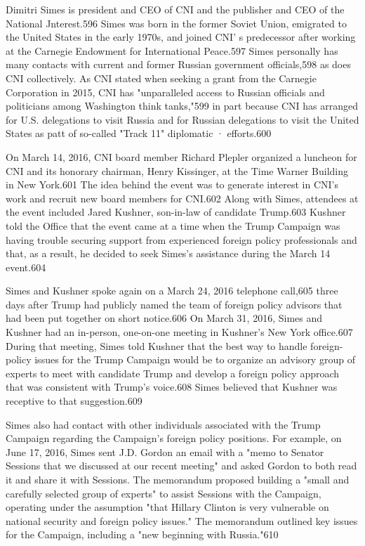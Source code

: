 Dimitri Simes is president and CEO of CNI and the publisher and CEO of the National Jnterest.596 Simes was born in the former Soviet Union, emigrated to the United States in the early 1970s, and joined CNI' s predecessor after working at the Carnegie Endowment for International Peace.597 Simes personally has many contacts with current and former Russian government officials,598 as does CNI collectively. As CNI stated when seeking a  grant from the Carnegie Corporation in 2015,  CNI has "unparalleled access to Russian officials and politicians among Washington think tanks,"599 in part because CNI has arranged for U.S. delegations to visit Russia and for Russian delegations to visit the United States as patt of so-called "Track 11" diplomatic · efforts.600

On March 14, 2016, CNI board member Richard Plepler organized a luncheon for CNI and its honorary chairman, Henry Kissinger, at the Time Warner Building in New York.601 The idea behind the event was to generate interest in CNI's work and recruit new board members for CNI.602 Along with Simes, attendees at the event included Jared Kushner,  son-in-law of candidate Trump.603 Kushner told the Office that the event came at a  time when the Trump Campaign was having trouble securing support from experienced foreign policy professionals and that, as a result, he decided to seek Simes's assistance during the March 14 event.604

Simes and Kushner spoke again on a  March 24, 2016 telephone call,605 three days after Trump had publicly named the team of foreign policy advisors that had been put together on short notice.606 On March 31, 2016, Simes and Kushner had an in-person,  one-on-one meeting in Kushner's New York office.607 During that meeting, Simes told Kushner that the best way to handle foreign-policy issues for the Trump Campaign would be to organize an advisory group of experts to meet with candidate Trump and develop a foreign policy approach that was consistent with Trump's voice.608 Simes believed that Kushner was receptive to that suggestion.609

Simes also had contact with other individuals associated with the Trump Campaign regarding the Campaign's foreign policy positions. For example, on June 17, 2016, Simes sent J.D. Gordon an email with a "memo to Senator Sessions that we discussed at our recent meeting" and asked Gordon to both read it and share it with Sessions. The memorandum proposed building a "small and carefully selected group of experts" to assist Sessions with the Campaign, operating under the assumption "that Hillary Clinton is very vulnerable on national security and foreign policy issues." The memorandum outlined key issues for the Campaign,  including a  "new beginning with Russia."610

